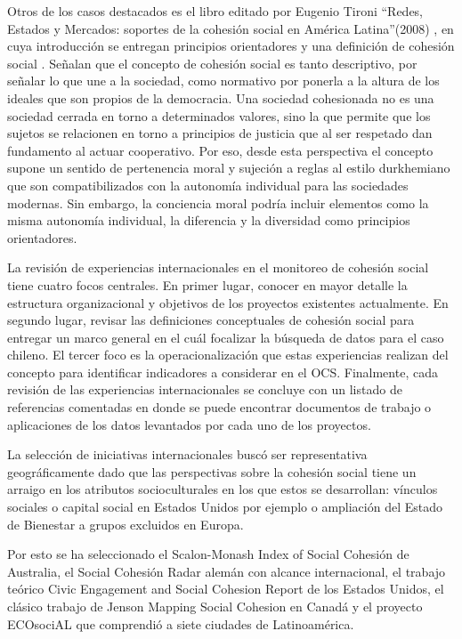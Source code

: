 \documentclass[
  12pt,
]{book}
\begin{document}
Otros de los casos destacados es el libro editado por Eugenio Tironi
``Redes, Estados y Mercados: soportes de la cohesión social en América
Latina''(2008) , en cuya introducción se entregan principios
orientadores y una definición de cohesión social
\citep{tironibarrios_Redes_2008} . Señalan que el concepto de cohesión social
es tanto descriptivo, por señalar lo que une a la sociedad, como
normativo por ponerla a la altura de los ideales que son propios de la
democracia. Una sociedad cohesionada no es una sociedad cerrada en torno
a determinados valores, sino la que permite que los sujetos se
relacionen en torno a principios de justicia que al ser respetado dan
fundamento al actuar cooperativo. Por eso, desde esta perspectiva el
concepto supone un sentido de pertenencia moral y sujeción a reglas al
estilo durkhemiano que son compatibilizados con la autonomía individual
para las sociedades modernas. Sin embargo, la conciencia moral podría
incluir elementos como la misma autonomía individual, la diferencia y la
diversidad como principios orientadores.

La revisión de experiencias internacionales en el monitoreo de cohesión
social tiene cuatro focos centrales. En primer lugar, conocer en mayor
detalle la estructura organizacional y objetivos de los proyectos
existentes actualmente. En segundo lugar, revisar las definiciones
conceptuales de cohesión social para entregar un marco general en el
cuál focalizar la búsqueda de datos para el caso chileno. El tercer foco
es la operacionalización que estas experiencias realizan del concepto
para identificar indicadores a considerar en el OCS. Finalmente, cada
revisión de las experiencias internacionales se concluye con un listado
de referencias comentadas en donde se puede encontrar documentos de
trabajo o aplicaciones de los datos levantados por cada uno de los
proyectos.

La selección de iniciativas internacionales buscó ser representativa
geográficamente dado que las perspectivas sobre la cohesión social tiene
un arraigo en los atributos socioculturales en los que estos se
desarrollan: vínculos sociales o capital social en Estados Unidos por
ejemplo o ampliación del Estado de Bienestar a grupos excluidos en
Europa.

Por esto se ha seleccionado el Scalon-Monash Index of Social Cohesión de
Australia, el Social Cohesión Radar alemán con alcance internacional, el
trabajo teórico Civic Engagement and Social Cohesion Report de los
Estados Unidos, el clásico trabajo de Jenson \citetext{\citeyear{jenson1998mapping}; \citeyear{jenson2010defining}} Mapping Social Cohesion en Canadá y el proyecto
ECOsociAL que comprendió a siete ciudades de Latinoamérica.
\end{document}

